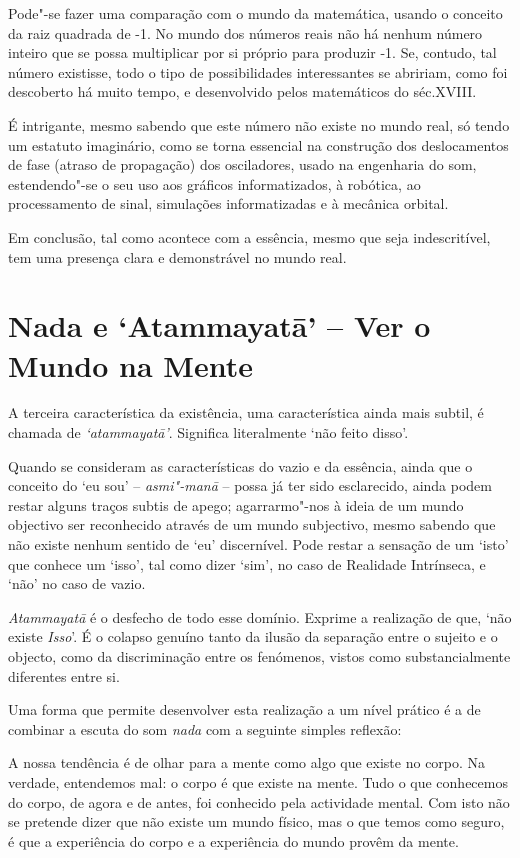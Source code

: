 Pode"-se fazer uma comparação com o mundo da matemática, usando o
conceito da raiz quadrada de -1. No mundo dos números reais não há
nenhum número inteiro que se possa multiplicar por si próprio para
produzir -1. Se, contudo, tal número existisse, todo o tipo de
possibilidades interessantes se abririam, como foi descoberto há muito
tempo, e desenvolvido pelos matemáticos do séc.XVIII.

É intrigante, mesmo sabendo que este número não existe no mundo real, só
tendo um estatuto imaginário, como se torna essencial na construção dos
deslocamentos de fase (atraso de propagação) dos osciladores, usado na
engenharia do som, estendendo"-se o seu uso aos gráficos informatizados,
à robótica, ao processamento de sinal, simulações informatizadas e à
mecânica orbital.

Em conclusão, tal como acontece com a essência, mesmo que seja
indescritível, tem uma presença clara e demonstrável no mundo real.\cite{imaginary}

\section{Nada e `Atammayatā' -- Ver o Mundo na Mente}

A terceira característica da existência, uma característica ainda mais
subtil, é chamada de \emph{`atammayatā'}. Significa literalmente `não
feito disso'.

Quando se consideram as características do vazio e da essência, ainda
que o conceito do `eu sou' -- \emph{asmi"-manā} -- possa já ter sido
esclarecido, ainda podem restar alguns traços subtis de apego;
agarrarmo"-nos à ideia de um mundo objectivo ser reconhecido através de
um mundo subjectivo, mesmo sabendo que não existe nenhum sentido de `eu'
discernível. Pode restar a sensação de um `isto' que conhece um `isso',
tal como dizer `sim', no caso de Realidade Intrínseca, e `não' no caso
de vazio.

\emph{Atammayatā} é o desfecho de todo esse domínio. Exprime a
realização de que, `não existe \emph{Isso}'. É o colapso genuíno tanto
da ilusão da separação entre o sujeito e o objecto, como da
discriminação entre os fenómenos, vistos como substancialmente
diferentes entre si.

Uma forma que permite desenvolver esta realização a um nível prático é a
de combinar a escuta do som \emph{nada} com a seguinte simples reflexão:

A nossa tendência é de olhar para a mente como algo que existe no corpo.
Na verdade, entendemos mal: o corpo é que existe na mente. Tudo o que
conhecemos do corpo, de agora e de antes, foi conhecido pela actividade
mental. Com isto não se pretende dizer que não existe um mundo físico,
mas o que temos como seguro, é que a experiência do corpo e a
experiência do mundo provêm da mente.

